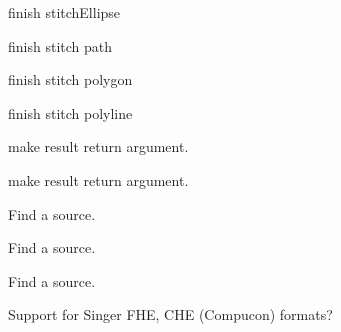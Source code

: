 \begin{DoxyRefList}
%
finish stitch\+Ellipse  
\item[Member \mbox{\hyperlink{fill_8c_a736fce5df010bbe74ea9ad2857be9bf4}{emb\+Pattern\+\_\+stitch\+Path}} (Emb\+Pattern $\ast$p, Emb\+Path path, int thread\+\_\+index, int style)]\label{todo__todo000214}%
%
finish stitch path  
\item[Member \mbox{\hyperlink{fill_8c_a86f903495c0da7514294200680bd6414}{emb\+Pattern\+\_\+stitch\+Polygon}} (Emb\+Pattern $\ast$p, Emb\+Polygon polygon, int thread\+\_\+index, int style)]\label{todo__todo000215}%
%
finish stitch polygon  
\item[Member \mbox{\hyperlink{fill_8c_a9ae9d5d7dfbb2ab361dc37970b7eb2f2}{emb\+Pattern\+\_\+stitch\+Polyline}} (Emb\+Pattern $\ast$p, Emb\+Polyline polyline, int thread\+\_\+index, int style)]\label{todo__todo000216}%
%
finish stitch polyline  
\item[Member \mbox{\hyperlink{vector_8c_a0a4af07bfac410623cf77a35a11550b1}{emb\+Vector\+\_\+multiply}} (Emb\+Vector vector, Emb\+Real magnitude, Emb\+Vector $\ast$result)]\label{todo__todo000232}%
%
make result return argument.  
\item[Member \mbox{\hyperlink{vector_8c_aaad72d90c58592e330de08139aee5077}{emb\+Vector\+\_\+normalize}} (Emb\+Vector vector, Emb\+Vector $\ast$result)]\label{todo__todo000231}%
%
make result return argument.  
\item[File \mbox{\hyperlink{format__art_8c}{format\+\_\+art.c}} ]\label{todo__todo000233}%
%
Find a source.  
\item[File \mbox{\hyperlink{format__bmc_8c}{format\+\_\+bmc.c}} ]\label{todo__todo000234}%
%
Find a source.  
\item[File \mbox{\hyperlink{format__cnd_8c}{format\+\_\+cnd.c}} ]\label{todo__todo000235}%
%
Find a source.  
\item[Page \mbox{\hyperlink{formats}{Formats}} ]\label{todo__todo000193}%
%
Support for Singer FHE, CHE (Compucon) formats?


\end{DoxyRefList}
